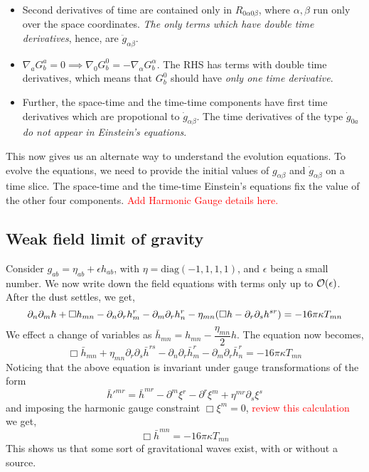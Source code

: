 \documentclass[a4paper,11pt]{article}
\begin{document}
\begin{itemize}
	\item Second derivatives of time are contained only in $ R_{0 \alpha 0 \beta} $, where $ \alpha, \beta $ run only over the space coordinates. \textit{The only terms which have double time derivatives}, hence, are $ \ddot{g}_{\alpha \beta} $.
	\item $ \nabla_a G^a_{b} = 0 \implies \nabla_0 G^0_{b} =-  \nabla_\alpha G^\alpha_{b}  $. The RHS has terms with double time derivatives, which means that $ G^0_{b} $ should have \textit{only one time derivative}.
	\item Further, the space-time and the time-time components have first time derivatives which are propotional to $ \dot{g}_{\alpha \beta} $. The time derivatives of the type $ \dot{g}_{0 a} $ \textit{do not appear in Einstein's equations}.
\end{itemize}
This now gives us an alternate way to understand the evolution equations. To evolve the equations, we need to provide the initial values of $ g_{\alpha \beta} $ and $ \dot{g}_{\alpha \beta} $ on a time slice. The space-time and the time-time Einstein's equations fix the value of the other four components. \textcolor{red}{Add Harmonic Gauge details here.}

\subsection{Weak field limit of gravity} 
Consider $ g_{ab} = \eta_{ab} + \epsilon h_{ab} $, with $  \eta = \text{diag} (-1,1,1,1) $, and $ \epsilon $ being a small number. We now write down the field equations with terms only up to $ \order{\epsilon} $. After the dust settles, we get,
\begin{equation*}
\partial_n \partial_m h + \Box h_{mn} - \partial_n \partial_r h^r_m - \partial_m \partial_r h^r_n - \eta_{mn} \qty(\Box h - \partial_r \partial_s h^{sr}) = - 16 \pi \kappa T_{mn}
\end{equation*}
We effect a change of variables as $ \bar{h}_{mn} = h_{mn} - \dfrac{\eta_{mn}}{2} h $. The equation now becomes,
\begin{equation*}
\Box \bar{h}_{mn} + \eta_{mn} \partial_r \partial_s \bar{h}^{rs} - \partial_n \partial_r \bar{h}^r_m - \partial_m \partial_r \bar{h}^r_n = - 16 \pi \kappa T_{mn}
\end{equation*}
Noticing that the above equation is invariant under gauge transformations of the form \begin{equation*}
\bar{h}'^{mr} = \bar{h}^{mr} - \partial^m \xi^r - \partial^r \xi^m + \eta^{mr} \partial_s \xi^s
\end{equation*}
and imposing the harmonic gauge constraint $ \Box \xi^m =0 $, \textcolor{red}{review this calculation} we get,
\begin{equation*}
\Box \bar{h}^{mn} = - 16 \pi \kappa T_{mn}
\end{equation*}
This shows us that some sort of gravitational waves exist, with or without a source.
\end{document}
